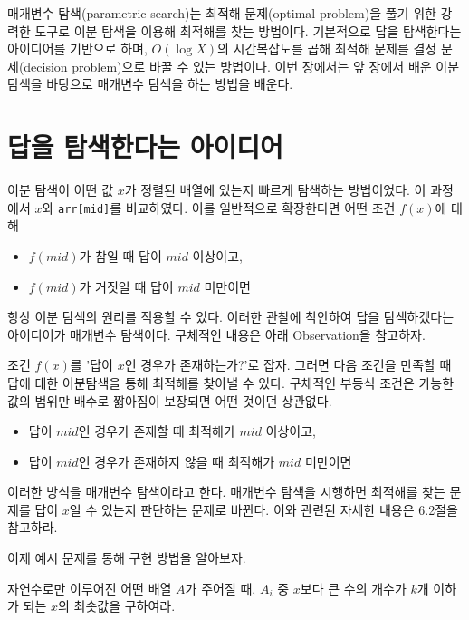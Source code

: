 매개변수 탐색(parametric search)는 최적해 문제(optimal problem)을 풀기 위한 강력한 도구로 이분 탐색을 이용해 최적해를 찾는 방법이다. 기본적으로 답을 탐색한다는 아이디어를 기반으로 하며, $O(\log X)$의 시간복잡도를 곱해 최적해 문제를 결정 문제(decision problem)으로 바꿀 수 있는 방법이다. 이번 장에서는 앞 장에서 배운 이분 탐색을 바탕으로 매개변수 탐색을 하는 방법을 배운다.

\section{답을 탐색한다는 아이디어}
이분 탐색이 어떤 값 $x$가 정렬된 배열에 있는지 빠르게 탐색하는 방법이었다. 이 과정에서 $x$와 \texttt{arr[mid]}를 비교하였다. 이를 일반적으로 확장한다면 어떤 조건 $f(x)$에 대해

\begin{itemize}
    \item $f(mid)$가 참일 때 답이 $mid$ 이상이고,
    \item $f(mid)$가 거짓일 때 답이 $mid$ 미만이면
\end{itemize}

항상 이분 탐색의 원리를 적용할 수 있다. 이러한 관찰에 착안하여 답을 탐색하겠다는 아이디어가 매개변수 탐색이다. 구체적인 내용은 아래 Observation을 참고하자.

\begin{obs}
    조건 $f(x)$를 '답이 $x$인 경우가 존재하는가?'로 잡자. 그러면 다음 조건을 만족할 때 답에 대한 이분탐색을 통해 최적해를 찾아낼 수 있다. 구체적인 부등식 조건은 가능한 값의 범위만 배수로 짧아짐이 보장되면 어떤 것이던 상관없다.

    \begin{itemize}
        \item 답이 $mid$인 경우가 존재할 때 최적해가 $mid$ 이상이고,
        \item 답이 $mid$인 경우가 존재하지 않을 때 최적해가 $mid$ 미만이면
    \end{itemize}
\end{obs}

이러한 방식을 매개변수 탐색이라고 한다. 매개변수 탐색을 시행하면 최적해를 찾는 문제를 답이 $x$일 수 있는지 판단하는 문제로 바뀐다. 이와 관련된 자세한 내용은 6.2절을 참고하라.

이제 예시 문제를 통해 구현 방법을 알아보자.

\begin{example} \label{ex: parametric-search}
    자연수로만 이루어진 어떤 배열 $A$가 주어질 때, $A_i$ 중 $x$보다 큰 수의 개수가 $k$개 이하가 되는 $x$의 최솟값을 구하여라.
\end{example}

